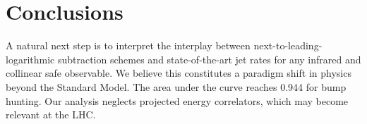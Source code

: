 \section{Conclusions}\label{sec:conclusions}

A natural next step is to interpret the interplay between
next-to-leading-logarithmic subtraction schemes and state-of-the-art jet
rates for any infrared and collinear safe observable. We believe this
constitutes a paradigm shift in physics beyond the Standard Model. The
area under the curve reaches 0.944 for bump hunting. Our analysis
neglects projected energy correlators, which may become relevant at the
LHC.

